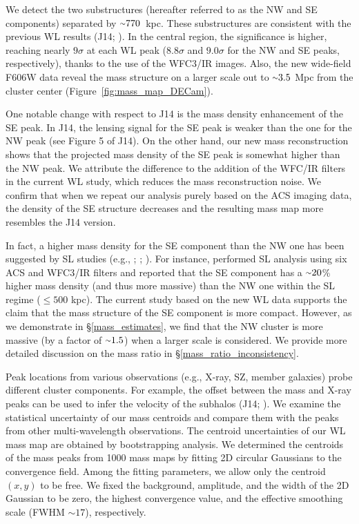 \documentclass[twocolumn]{aastex631}
\newcommand{\mytilde}{\raise.19ex\hbox{$\scriptstyle\sim$}}
\begin{document}
We detect the two substructures (hereafter referred to as the NW and SE components) separated by $\mytilde770$~kpc. 
These substructures are consistent with the previous WL results (J14; \citealt{Schrabback2018}). 
In the central region, the significance is higher, reaching nearly $9\sigma$ at each WL peak ($8.8\sigma$ and $9.0\sigma$ for the NW and SE peaks, respectively), thanks to the use of the WFC3/IR images. Also, the new wide-field F606W data reveal the mass structure on a larger scale out to $\mytilde3.5$ Mpc from the cluster center (Figure~\ref{fig:mass_map_DECam}).


One notable change with respect to J14 is the mass density enhancement of the SE peak. 
In J14, the lensing signal for the SE peak is weaker than the one for the NW peak (see Figure 5 of J14). On the other hand, our new mass reconstruction shows that the projected mass density of the SE peak is somewhat higher than the NW peak. 
We attribute the difference to the addition of the WFC/IR filters in the current WL study, which reduces the mass reconstruction noise. 
We confirm that when we repeat our analysis purely based on the ACS imaging data, the density of the SE structure decreases and the resulting mass map more resembles the J14 version.


In fact, a higher mass density for the SE component than the NW one has been suggested by SL studies (e.g., \citealt{Zitrin2013}; \citealt{Cerny2018}; \citealt{Diego2020}). For instance, \cite{Cerny2018} performed SL analysis using six ACS and WFC3/IR filters and reported that the SE component has a $\mytilde20$\% higher mass density (and thus more massive) than the NW one within the SL regime ($\leq500$ kpc). 
The current study based on the new WL data supports the claim that the mass structure of the SE component is more compact. 
However, as we demonstrate in \S\ref{mass_estimates}, we find that the NW cluster is more massive (by a factor of $\mytilde1.5$) when a larger scale is considered. We provide more detailed discussion on the mass ratio in \S\ref{mass_ratio_inconsistency}. 


Peak locations from various observations (e.g., X-ray, SZ, member galaxies) probe different cluster components. 
For example, the offset between the mass and X-ray peaks can be used to infer the velocity of the subhalos (J14; \citealt{Ng2015}). 
We examine the statistical uncertainty of our mass centroids and compare them with the peaks from other multi-wavelength observations. 
The centroid uncertainties of our WL mass map are obtained by bootstrapping analysis. 
We determined the centroids of the mass peaks from 1000 mass maps by fitting 2D circular Gaussians to the convergence field. 
Among the fitting parameters, we allow only the centroid $(x, y)$ to be free. We fixed the background, amplitude, and the width of the 2D Gaussian to be zero, the highest convergence value, and the effective smoothing scale (FWHM $\sim17$\arcsec), respectively.
\end{document}
